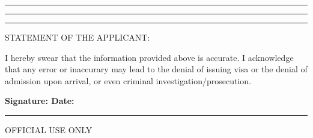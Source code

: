 \par\hrule
\formbrickVlineLeft%
\formbrickVlineRight%
\par\hrule
\formbrickVlineLeft%
\formbrickVlineMid%
\formbrickVlineRight%
\par\hrule
\vskip 5pt




\parbox{\linewidth}{
	\small
	STATEMENT OF THE APPLICANT:\par\vskip 5pt
	I hereby swear that the information provided above is accurate. I acknowledge that any error or inaccurary may lead to the denial of issuing visa or the denial of admission upon arrival, or even criminal investigation/prosecution.\par\vskip 5pt
	\bfseries
	Signature:\hfill
	Date:\hfill
	\hspace{1pt}\par
}
\vskip 15pt
\hrule
\begin{center}
	\small OFFICIAL USE ONLY
\end{center}






